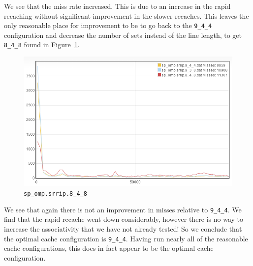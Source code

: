 We see that the miss rate increased. This is due to an increase in the rapid recaching without significant improvement in the slower recaches. This leaves the only reasonable place for improvement to be to go back to the \texttt{9\_4\_4} configuration and decrease the number of sets instead of the line length, to get \texttt{8\_4\_8} found in Figure~\ref{8_4_8}.

\begin{figure}[h]
\begin{center}
\includegraphics[width={0.9\columnwidth}]{images/sp_omp-srrip-8_4_8}
\end{center}
\caption{\texttt{sp\_omp.srrip.8\_4\_8}}
\label{8_4_8}
\end{figure}

We see that again there is not an improvement in misses relative to \texttt{9\_4\_4}. 
We find that the rapid recache went down considerably, however there is no way to increase the associativity that we have not already tested! So we conclude that the optimal cache configuration is \texttt{9\_4\_4}. Having run nearly all of the reasonable cache configurations, this does in fact appear to be the optimal cache configuration.

